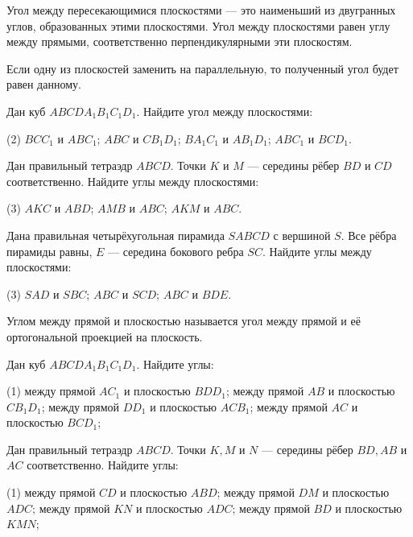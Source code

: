 \begin{class}[number=1]
		\begin{definit}
			Угол между пересекающимися плоскостями --- это наименьший из двугранных углов, образованных этими плоскостями.
			Угол между плоскостями равен углу между прямыми, соответственно перпендикулярными эти плоскостям.
		\end{definit}
		\begin{definit}
			Если одну из плоскостей заменить на параллельную, то полученный угол будет равен данному.
		\end{definit}
	\begin{listofex}
		\item Дан куб \(ABCDA_1B_1C_1D_1\). Найдите угол между плоскостями:
		\begin{tasks}(2)
			\task \( BCC_1 \) и \( ABC_1 \);
			\task \( ABC \) и \( CB_1D_1 \);
			\task \( BA_1C_1 \) и \( AB_1D_1 \);
			\task \( ABC_1 \) и \( BCD_1 \).
		\end{tasks}
		\item Дан правильный тетраэдр \(ABCD\). Точки \(K\) и \(M\) --- середины рёбер \(BD\) и \(CD\) соответственно. Найдите углы между плоскостями:
		\begin{tasks}(3)
			\task \( AKC \) и \( ABD \);
			\task \( AMB \) и \( ABC \);
			\task \( AKM \) и \( ABC \).
		\end{tasks}
		\item Дана правильная четырёхугольная пирамида \(SABCD\) с вершиной \(S\). Все рёбра пирамиды равны, \(E\) --- середина бокового ребра \(SC\). Найдите углы между плоскостями:
		\begin{tasks}(3)
			\task \( SAD \) и \( SBC \);
			\task \( ABC \) и \( SCD \);
			\task \( ABC \) и \( BDE \).
		\end{tasks}
	\end{listofex}
	\begin{definit}
		Углом между прямой и плоскостью называется угол между прямой и её ортогональной проекцией на плоскость.
	\end{definit}
	\begin{listofex}[resume]
		\item Дан куб \(ABCDA_1B_1C_1D_1\). Найдите углы:
		\begin{tasks}(1)
			\task между прямой \( AC_1 \) и плоскостью \(BDD_1 \);
			\task между прямой \(  AB\) и плоскостью \( CB_1D_1\);
			\task между прямой \( DD_1 \) и плоскостью \( ACB_1\);
			\task между прямой \( AC \) и плоскостью \( BCD_1\);
		\end{tasks}
		\item Дан правильный тетраэдр \(ABCD\). Точки \(K, M\) и \(N\) --- середины рёбер \(BD, AB\) и \(AC\) соответственно. Найдите углы:
		\begin{tasks}(1)
			\task между прямой \( CD \) и плоскостью \(ABD \);
			\task между прямой \(  DM\) и плоскостью \( ADC \);
			\task между прямой \( KN \) и плоскостью \( ADC\);
			\task между прямой \( BD \) и плоскостью \( KMN\);
		\end{tasks}
	\end{listofex}
\end{class}

